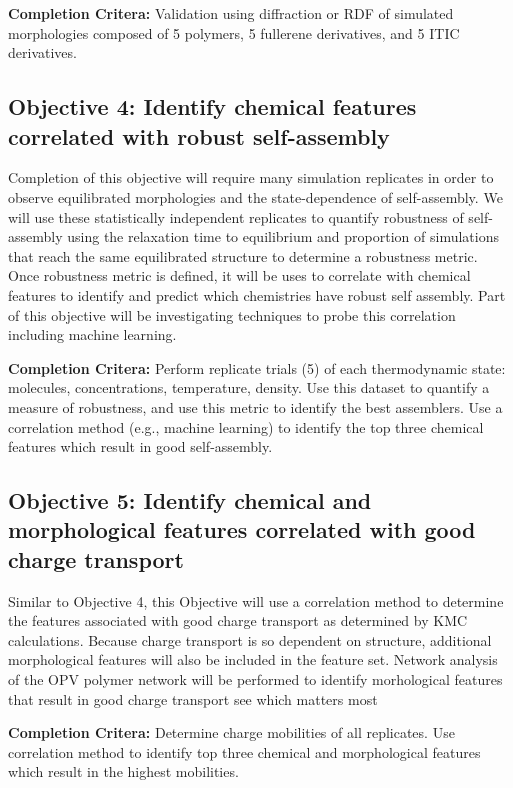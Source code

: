 \textbf{Completion Critera:} 
Validation using diffraction or RDF of simulated morphologies composed of 5 polymers, 5 fullerene derivatives, and 5 ITIC derivatives. 

\subsection*{Objective 4: Identify chemical features correlated with robust self-assembly}

Completion of this objective will require many simulation replicates in order to observe equilibrated morphologies and the state-dependence of self-assembly.
We will use these statistically independent replicates to quantify robustness of self-assembly using the relaxation time to equilibrium and proportion of simulations that reach the same equilibrated structure to determine a robustness metric.
Once robustness metric is defined, it will be uses to correlate with chemical features to identify and predict which chemistries have robust self assembly.
Part of this objective will be investigating techniques to probe this correlation including machine learning.

\textbf{Completion Critera:}
Perform replicate trials (5) of each thermodynamic state: molecules, concentrations, temperature, density. Use this dataset to quantify a measure of robustness, and use this metric to identify the best assemblers. Use a correlation method (e.g., machine learning) to identify the top three chemical features which result in good self-assembly.

\subsection*{Objective 5: Identify chemical and morphological features correlated with good charge transport}

Similar to Objective 4, this Objective will use a correlation method to determine the features associated with good charge transport as determined by KMC calculations.
Because charge transport is so dependent on structure, additional morphological features will also be included in the feature set.
Network analysis of the OPV polymer network will be performed to identify morhological features that result in good charge transport see which matters most

\textbf{Completion Critera:} Determine charge mobilities of all replicates. Use correlation method to identify top three chemical and morphological features which result in the highest mobilities.

